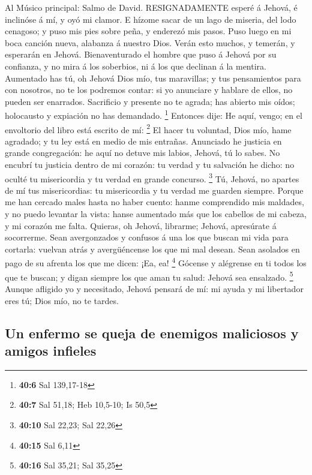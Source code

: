  Al Músico principal: Salmo de David. RESIGNADAMENTE esperé
á Jehová, é inclinóse á mí, y oyó mi clamor.  E hízome sacar
de un lago de miseria, del lodo cenagoso; y puso mis pies sobre peña, y
enderezó mis pasos.  Puso luego en mi boca canción nueva,
alabanza á nuestro Dios. Verán esto muchos, y temerán, y esperarán en
Jehová.  Bienaventurado el hombre que puso á Jehová por su
confianza, y no mira á los soberbios, ni á los que declinan á la
mentira.  Aumentado has tú, oh Jehová Dios mío, tus
maravillas; y tus pensamientos para con nosotros, no te los podremos
contar: si yo anunciare y hablare de ellos, no pueden ser enarrados.
 Sacrificio y presente no te agrada; has abierto mis oídos;
holocausto y expiación no has demandado. \footnote{\textbf{40:6} Sal
  139,17-18}  Entonces dije: He aquí, vengo; en el
envoltorio del libro está escrito de mí: \footnote{\textbf{40:7} Sal
  51,18; Heb 10,5-10; Is 50,5}  El hacer tu voluntad, Dios
mío, hame agradado; y tu ley está en medio de mis entrañas. 
Anunciado he justicia en grande congregación: he aquí no detuve mis
labios, Jehová, tú lo sabes.  No encubrí tu justicia dentro
de mi corazón: tu verdad y tu salvación he dicho: no oculté tu
misericordia y tu verdad en grande concurso. \footnote{\textbf{40:10}
  Sal 22,23; Sal 22,26}  Tú, Jehová, no apartes de mí tus
misericordias: tu misericordia y tu verdad me guarden siempre.
 Porque me han cercado males hasta no haber cuento: hanme
comprendido mis maldades, y no puedo levantar la vista: hanse aumentado
más que los cabellos de mi cabeza, y mi corazón me falta. 
Quieras, oh Jehová, librarme; Jehová, apresúrate á socorrerme.
 Sean avergonzados y confusos á una los que buscan mi vida
para cortarla: vuelvan atrás y avergüéncense los que mi mal desean.
 Sean asolados en pago de su afrenta los que me dicen: ¡Ea,
ea! \footnote{\textbf{40:15} Sal 6,11}  Gócense y alégrense
en ti todos los que te buscan; y digan siempre los que aman tu salud:
Jehová sea ensalzado. \footnote{\textbf{40:16} Sal 35,21; Sal 35,25}
 Aunque afligido yo y necesitado, Jehová pensará de mí: mi
ayuda y mi libertador eres tú; Dios mío, no te tardes.

\hypertarget{un-enfermo-se-queja-de-enemigos-maliciosos-y-amigos-infieles}{%
\subsection{Un enfermo se queja de enemigos maliciosos y amigos
infieles}\label{un-enfermo-se-queja-de-enemigos-maliciosos-y-amigos-infieles}}

